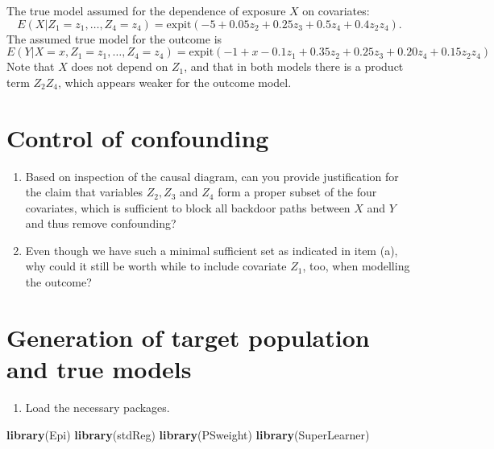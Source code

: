 \documentclass[
]{book}
\newenvironment{Shaded}{\begin{snugshade}}{\end{snugshade}}
\newcommand{\FunctionTok}[1]{\textcolor[rgb]{0.13,0.29,0.53}{\textbf{#1}}}
\newcommand{\NormalTok}[1]{#1}
\providecommand{\tightlist}{%
  \setlength{\itemsep}{0pt}\setlength{\parskip}{0pt}}
\begin{document}
The true model assumed for the dependence of exposure \(X\) on covariates:
\[ E(X|Z_1 = z_1, \dots, Z_4 = z_4) =
      \text{expit}(-5 + 0.05z_2 + 0.25z_3 + 0.5z_4 + 0.4z_2z_4) . \]
The assumed true model for the outcome is
\[ E(Y|X=x, Z_1 = z_1, \dots, Z_4 = z_4) =
           \text{expit}(-1 + x - 0.1z_1 + 0.35z_2 + 0.25z_3 +
                 0.20z_4 + 0.15z_2z_4) \]
Note that \(X\) does not depend on \(Z_1\), and that in both models
there is a product term \(Z_2 Z_4\), which
appears weaker for the outcome model.

\section{Control of confounding}\label{control-of-confounding}

\begin{enumerate}
\def\labelenumi{\arabic{enumi}.}
\item
  Based on inspection of the causal diagram, can you
  provide justification for the claim that
  variables \(Z_2, Z_3\) and \(Z_4\) form a proper subset
  of the four covariates, which is sufficient to block
  all backdoor paths between \(X\) and \(Y\)
  and thus remove confounding?
\item
  Even though we have such a minimal sufficient set as
  indicated in item (a), why could it still
  be worth while to include covariate \(Z_1\), too,
  when modelling the outcome?
\end{enumerate}

\section{Generation of target population and true models}\label{generation-of-target-population-and-true-models}

\begin{enumerate}
\def\labelenumi{\arabic{enumi}.}
\tightlist
\item
  Load the necessary packages.
\end{enumerate}

\begin{Shaded}
\begin{Highlighting}[]
\FunctionTok{library}\NormalTok{(Epi)}
\FunctionTok{library}\NormalTok{(stdReg)}
\FunctionTok{library}\NormalTok{(PSweight)}
\FunctionTok{library}\NormalTok{(SuperLearner)}
\end{Highlighting}
\end{Shaded}
\end{document}
